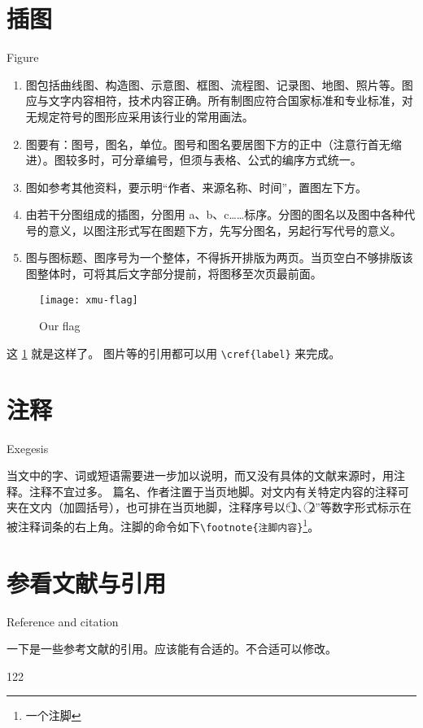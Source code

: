 
\section{插图}{Figure}

\begin{enumerate}
	\item 图包括曲线图、构造图、示意图、框图、流程图、记录图、地图、照片等。图应与文字内容相符，技术内容正确。所有制图应符合国家标准和专业标准，对无规定符号的图形应采用该行业的常用画法。
	\item 图要有：图号，图名，单位。图号和图名要居图下方的正中（注意行首无缩进）。图较多时，可分章编号，但须与表格、公式的编序方式统一。
	\item 图如参考其他资料，要示明“作者、来源名称、时间”，置图左下方。
	\item 由若干分图组成的插图，分图用 a、b、c……标序。分图的图名以及图中各种代号的意义，以图注形式写在图题下方，先写分图名，另起行写代号的意义。
	\item 图与图标题、图序号为一个整体，不得拆开排版为两页。当页空白不够排版该图整体时，可将其后文字部分提前，将图移至次页最前面。
\end{enumerate}

\begin{figure}[h!]
\centering
\texttt{[image: xmu-flag]}
\caption{Our flag} \label{fig1}
\end{figure}

这 \cref{fig1} 就是这样了。 图片等的引用都可以用 \verb|\cref{label}| 来完成。


\section{注释}{Exegesis}

当文中的字、词或短语需要进一步加以说明，而又没有具体的文献来源时，用注释。注释不宜过多。
篇名、作者注置于当页地脚。对文内有关特定内容的注释可夹在文内（加圆括号），也可排在当页地脚，注释序号以“\textcircled{1}、\textcircled{2}”等数字形式标示在被注释词条的右上角。注脚的命令如下\verb|\footnote{注脚内容}|\footnote{一个注脚}。

\section{参看文献与引用}{Reference and citation}

一下是一些参考文献的引用。应该能有合适的。不合适可以修改。

122

\cite{刘海洋2013latex}

\citet{刘海洋2013latex}

\citep{刘海洋2013latex}

\citealt{刘海洋2013latex}

\citealt*{刘海洋2013latex}

\citeauthor{刘海洋2013latex}

\citeyearpar{刘海洋2013latex}
